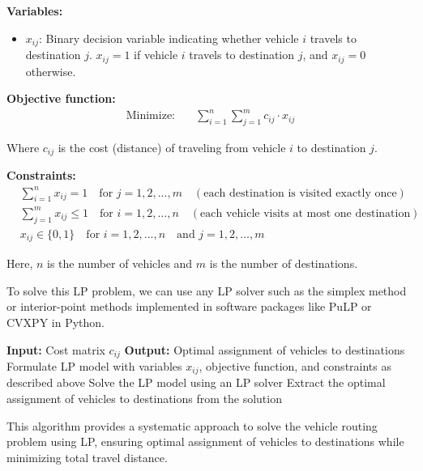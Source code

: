 \documentclass[12pt]{book} %
\begin{document}
\textbf{Variables:}
\begin{itemize}
    \item \(x_{ij}\): Binary decision variable indicating whether vehicle \(i\) travels to destination \(j\). \(x_{ij} = 1\) if vehicle \(i\) travels to destination \(j\), and \(x_{ij} = 0\) otherwise.
\end{itemize}

\textbf{Objective function:}
\begin{align*}
\text{Minimize:} \quad & \sum_{i=1}^{n} \sum_{j=1}^{m} c_{ij} \cdot x_{ij}
\end{align*}

Where \(c_{ij}\) is the cost (distance) of traveling from vehicle \(i\) to destination \(j\).

\textbf{Constraints:}
\begin{align*}
& \sum_{i=1}^{n} x_{ij} = 1 \quad \text{for } j=1,2,...,m \quad (\text{each destination is visited exactly once}) \\
& \sum_{j=1}^{m} x_{ij} \leq 1 \quad \text{for } i=1,2,...,n \quad (\text{each vehicle visits at most one destination}) \\
& x_{ij} \in \{0, 1\} \quad \text{for } i=1,2,...,n \quad \text{and } j=1,2,...,m
\end{align*}

Here, \(n\) is the number of vehicles and \(m\) is the number of destinations.

To solve this LP problem, we can use any LP solver such as the simplex method or interior-point methods implemented in software packages like PuLP or CVXPY in Python.

\FloatBarrier
\begin{algorithm}
    \caption{Vehicle Routing Problem using Linear Programming}
    \begin{algorithmic}[1]
        \State \textbf{Input:} Cost matrix \(c_{ij}\)
        \State \textbf{Output:} Optimal assignment of vehicles to destinations
        \State Formulate LP model with variables \(x_{ij}\), objective function, and constraints as described above
        \State Solve the LP model using an LP solver
        \State Extract the optimal assignment of vehicles to destinations from the solution
    \end{algorithmic}
\end{algorithm}
\FloatBarrier

This algorithm provides a systematic approach to solve the vehicle routing problem using LP, ensuring optimal assignment of vehicles to destinations while minimizing total travel distance.
\end{document}
